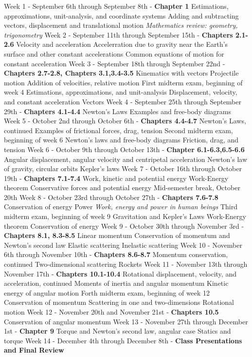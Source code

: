 \documentclass[10pt]{article}
\begin{document}
\begin{outline}[enumerate]
\1 Week 1 - September 6th through September 8th - \textbf{Chapter 1}
\2 Estimations, approximations, unit-analysis, and coordinate systems
\2 Adding and subtracting vectors, displacement and translational motion
\2 \textit{Mathematics review: geometry, trigonometry}
\1 Week 2 - September 11th through September 15th - \textbf{Chapters 2.1-2.6}
\2 Velocity and acceleration
\2 Accelerration due to gravity near the Earth's surface and other constant accelerations
\2 Common equations of motion for constant acceleration
\1 Week 3 - September 18th through September 22nd - \textbf{Chapters 2.7-2.8, Chapters 3.1,3.4-3.5}
\2 Kinematics with vectors
\2 Projectile motion
\2 Addition of velocities, relative motion
\1 First midterm exam, beginning of week 4
\2 Estimations, approximations, and unit-analysis
\2 Displacement, velocity, and constant acceleration
\2 Vectors
\1 Week 4 - September 25th through September 29th - \textbf{Chapters 4.1-4.4}
\2 Newton's Laws
\2 Examples and free-body diagrams
\1 Week 5 - October 2nd through October 6th - \textbf{Chapters 4.4-4.7}
\2 Newton's Laws, continued
\2 Examples of frictional forces, drag, tension
\1 Second midterm exam, beginning of week 6
\2 Newton's laws and free-body diagrams
\2 Friction, drag, and tension
\1 Week 6 - October 9th through October 13th - \textbf{Chapter 6.1-6.3,6.5-6.6}
\2 Angular displacement, angular velocity and centripetal acceleration
\2 Newton's law of gravity, circular orbits
\2 Kepler's laws
\1 Week 7 - October 16th through October 19th - \textbf{Chapters 7.1-7.4}
\2 Work, kinetic and potential energy
\2 Work-Energy theorem
\2 Conservative forces and potential energy
\1 Mid-semester break, October 20th
\1 Week 8 - October 23rd through October 27th - \textbf{Chapters 7.6-7.8}
\2 Conservation of energy
\2 Power
\2 \textit{Work, energy and power in human beings}
\1 Third midterm exam, beginning of week 9
\2 Gravitation and Kepler's Laws
\2 Work-Energy theorem
\2 Conservation of energy
\1 Week 9 - October 30th through November 3rd - \textbf{Chapters 8.1, 8.3-8.5}
\2 Linear momentum
\2 Conservation of momentum and Newton's second law
\2 Elastic scattering
\2 Inelastic scattering
\1 Week 10 - November 6th through November 10th - \textbf{Chapters 8.6-8.7}
\2 Momentum conservation, continued
\2 Two-dimensional scattering
\2 Rockets
\1 Week 11 - November 13th through November 17th - \textbf{Chapters 10.1-10.4}
\2 Rotational displacement, velocity, and acceleration, continued
\2 Moments of inertia and angular momentum
\2 Kinetic energy of angular motion
\1 Forth midterm exam, beginning of week 12
\2 Conservation of momentum
\2 Scattering in one and two-dimensions
\2 Rotational motion
\1 Week 12 - November 20th and November 21st - \textbf{Chapters 10.5}
\2 Conservation of angular momentum
\1 Week 13 - November 27th through December 1st  - \textbf{Chapter 9}
\2 Torque and Newton's second law, angular case
\2 Statics and torque
\1 Week 14 - December 4th through December 8th - \textbf{Class Presentations and Final Review}
\end{outline}
\end{document}
